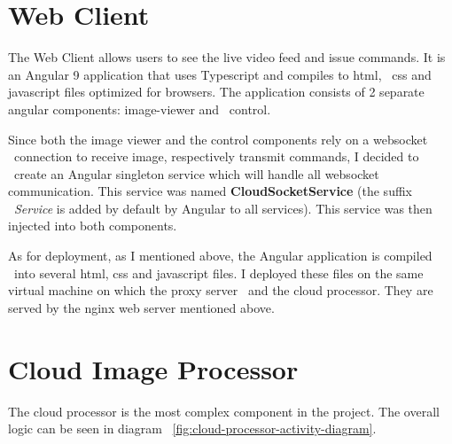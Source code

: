 \section{Web Client}
\label{sec:implementation-web-client}
The Web Client allows users to see the live video feed and issue commands.
It is an Angular 9 application that uses Typescript and compiles to html, \
css and javascript files optimized for browsers.
The application consists of 2 separate angular components: image-viewer and \
control.

Since both the image viewer and the control components rely on a websocket \
connection to receive image, respectively transmit commands, I decided to \
create an Angular singleton service which will handle all websocket communication.
This service was named \textbf{CloudSocketService} (the suffix \
\textit{Service} is added by default by Angular to all services).
This service was then injected into both components.

As for deployment, as I mentioned above, the Angular application is compiled \
into several html, css and javascript files.
I deployed these files on the same virtual machine on which the proxy server \
and the cloud processor.
They are served by the nginx web server mentioned above.


\section{Cloud Image Processor}
\label{sec:implementation-cloud-processor}
The cloud processor is the most complex component in the project.
The overall logic can be seen in diagram ~\ref{fig:cloud-processor-activity-diagram}.

